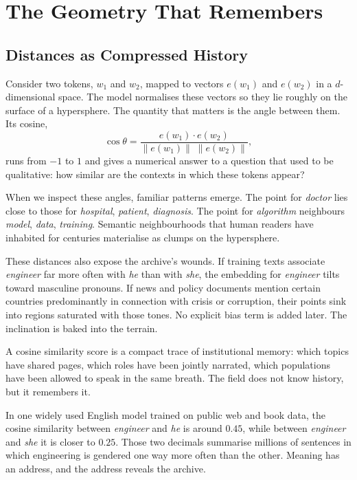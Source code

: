 \documentclass[12pt,a4paper]{article}
\begin{document}
\section{The Geometry That Remembers}

\subsection{Distances as Compressed History}

Consider two tokens, $w_1$ and $w_2$, mapped to vectors $e(w_1)$ and $e(w_2)$ in a $d$-dimensional space. The model normalises these vectors so they lie roughly on the surface of a hypersphere. The quantity that matters is the angle between them. Its cosine,
\[
\cos \theta = \frac{e(w_1)\cdot e(w_2)}{\lVert e(w_1)\rVert\;\lVert e(w_2)\rVert},
\]
runs from $-1$ to $1$ and gives a numerical answer to a question that used to be qualitative: how similar are the contexts in which these tokens appear?

When we inspect these angles, familiar patterns emerge. The point for \emph{doctor} lies close to those for \emph{hospital}, \emph{patient}, \emph{diagnosis}. The point for \emph{algorithm} neighbours \emph{model}, \emph{data}, \emph{training}. Semantic neighbourhoods that human readers have inhabited for centuries materialise as clumps on the hypersphere.

These distances also expose the archive's wounds. If training texts associate \emph{engineer} far more often with \emph{he} than with \emph{she}, the embedding for \emph{engineer} tilts toward masculine pronouns. If news and policy documents mention certain countries predominantly in connection with crisis or corruption, their points sink into regions saturated with those tones. No explicit bias term is added later. The inclination is baked into the terrain.

A cosine similarity score is a compact trace of institutional memory: which topics have shared pages, which roles have been jointly narrated, which populations have been allowed to speak in the same breath. The field does not know history, but it remembers it.

In one widely used English model trained on public web and book data, the cosine similarity between \emph{engineer} and \emph{he} is around $0.45$, while between \emph{engineer} and \emph{she} it is closer to $0.25$. Those two decimals summarise millions of sentences in which engineering is gendered one way more often than the other. Meaning has an address, and the address reveals the archive.
\end{document}
